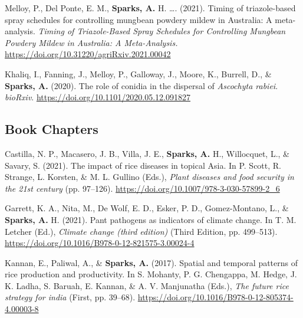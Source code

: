 \documentclass[11pt, a4paper]{awesome-cv}
\begin{document}
\begingroup
\setlength{\parindent}{-0.5in}
\setlength{\leftskip}{0.5in}

\hypertarget{refs_preprints}{}
\leavevmode{}%
Melloy, P., Del Ponte, E. M., \textbf{Sparks, A.} H. \ldots{}. (2021).
Timing of triazole-based spray schedules for controlling mungbean
powdery mildew in {Australia}: A meta-analysis. \emph{Timing of
Triazole-Based Spray Schedules for Controlling Mungbean Powdery Mildew
in Australia: A Meta-Analysis.}
\url{https://doi.org/10.31220/agriRxiv.2021.00042}

\leavevmode{}%
Khaliq, I., Fanning, J., Melloy, P., Galloway, J., Moore, K., Burrell,
D., \& \textbf{Sparks, A.} (2020). The role of conidia in the dispersal
of \emph{{Ascochyta} rabiei}. \emph{bioRxiv}.
\url{https://doi.org/10.1101/2020.05.12.091827}

\endgroup

\hypertarget{book-chapters}{%
\subsection{Book Chapters}\label{book-chapters}}

\begingroup
\setlength{\parindent}{-0.5in}
\setlength{\leftskip}{0.5in}

\hypertarget{refs_books}{}
\leavevmode{}%
Castilla, N. P., Macasero, J. B., Villa, J. E., \textbf{Sparks, A.} H.,
Willocquet, L., \& Savary, S. (2021). The impact of rice diseases in
topical {Asia}. In P. Scott, R. Strange, L. Korsten, \& M. L. Gullino
(Eds.), \emph{Plant diseases and food security in the 21st century} (pp.
97--126). \url{https://doi.org/10.1007/978-3-030-57899-2_6}

\leavevmode{}%
Garrett, K. A., Nita, M., De Wolf, E. D., Esker, P. D., Gomez-Montano,
L., \& \textbf{Sparks, A.} H. (2021). Pant pathogens as indicators of
climate change. In T. M. Letcher (Ed.), \emph{Climate change (third
edition)} (Third Edition, pp. 499--513).
\url{https://doi.org/10.1016/B978-0-12-821575-3.00024-4}

\leavevmode{}%
Kannan, E., Paliwal, A., \& \textbf{Sparks, A.} (2017). Spatial and
temporal patterns of rice production and productivity. In S. Mohanty, P.
G. Chengappa, M. Hedge, J. K. Ladha, S. Baruah, E. Kannan, \& A. V.
Manjunatha (Eds.), \emph{The future rice strategy for india} (First, pp.
39--68). \url{https://doi.org/10.1016/B978-0-12-805374-4.00003-8}
\end{document}
